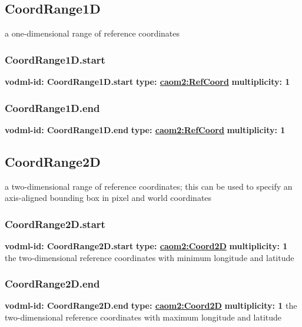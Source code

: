   \subsection{CoordRange1D}
  \label{sect:CoordRange1D}
    a one-dimensional range of reference coordinates

    \subsubsection{CoordRange1D.start}
      \textbf{vodml-id: CoordRange1D.start} \newline
      \textbf{type: \hyperref[sect:RefCoord]{caom2:RefCoord}} \newline
      \textbf{multiplicity: 1} 

    \subsubsection{CoordRange1D.end}
      \textbf{vodml-id: CoordRange1D.end} \newline
      \textbf{type: \hyperref[sect:RefCoord]{caom2:RefCoord}} \newline
      \textbf{multiplicity: 1} 

  \subsection{CoordRange2D}
  \label{sect:CoordRange2D}
    a two-dimensional range of reference coordinates; this can be used to specify an axis-aligned bounding box in pixel and world coordinates

    \subsubsection{CoordRange2D.start}
      \textbf{vodml-id: CoordRange2D.start} \newline
      \textbf{type: \hyperref[sect:Coord2D]{caom2:Coord2D}} \newline
      \textbf{multiplicity: 1} \newline
      the two-dimensional reference coordinates with minimum longitude and latitude

    \subsubsection{CoordRange2D.end}
      \textbf{vodml-id: CoordRange2D.end} \newline
      \textbf{type: \hyperref[sect:Coord2D]{caom2:Coord2D}} \newline
      \textbf{multiplicity: 1} \newline
      the two-dimensional reference coordinates with maximum longitude and latitude

